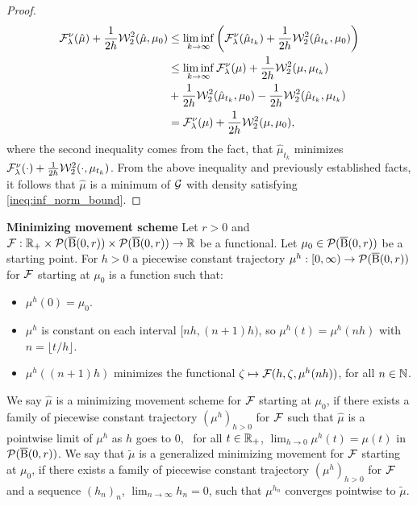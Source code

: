 \begin{proof}
\[
\begin{aligned}
\mathcal{F}^{\nu}_{\lambda}(\hat{\mu}) + \frac{1}{2h} {\cal W}_2^2(\hat{\mu}, \mu_0)  & \leq \liminf_{k \rightarrow \infty} \left( \mathcal{F}^{\nu}_{\lambda}(\hat{\mu}_{t_k}) + \frac{1}{2h} {\cal W}_2^2(\hat{\mu}_{t_k} , \mu_0) \right) \\
& \leq \liminf_{k \rightarrow \infty}  \mathcal{F}^{\nu}_{\lambda}(\mu) + \frac{1}{2h} {\cal W}_2^2(\mu , \mu_{t_k})   \\
& + \frac{1}{2h}  {\cal W}_2^2(\hat{\mu}_{t_k}, \mu_0) - \frac{1}{2h} {\cal W}_2^2(\hat{\mu}_{t_k}, \mu_{t_k})   \\
& = \mathcal{F}^{\nu}_{\lambda} (\mu) + \frac{1}{2h} {\cal W}_2^2(\mu, \mu_0) ,
\end{aligned}
\]
where the second inequality comes from the fact, that $\hat{\mu}_{t_k}$ minimizes $\mathcal{F}^{\nu}_{\lambda}(\cdot) + \frac{1}{2h}{\cal W}_2^2(\cdot, \mu_{t_k})$. From the above inequality and previously established facts, it follows that $\hat{\mu}$ is a minimum of $\mathcal{G}$ with density satisfying \ref{ineq:inf_norm_bound}.
\end{proof}

\begin{definition} \textbf{Minimizing movement scheme}
Let $r >0$ and  $\mathcal{F} : \mathbb{R_+} \times {\cal P}(\operatorname{\overline{B}}(0,r)) \times {\cal P}(\operatorname{\overline{B}}(0,r))\rightarrow \mathbb{R}$ be a functional. Let $\mu_0 \in {\cal P}(\operatorname{\overline{B}}(0,r))$ be a starting point. For $h> 0$ a piecewise constant trajectory $\mu^h : [0, \infty) \rightarrow {\cal P}(\operatorname{\overline{B}}(0,r))$ for $\mathcal{F}$ starting at $\mu_0$ is a function such that:
\begin{itemize}
\item $\mu^h(0) = \mu_0$.
\item $\mu^h$ is constant on each interval $[nh, (n+1)h)$, so $\mu^h(t) = \mu^h(nh)$ with $n = \lfloor t/h \rfloor$.
\item $\mu^h((n+1)h )$ minimizes the  functional $ \zeta  \mapsto \mathcal{F}(h,  \zeta ,\mu^h(nh))$, for all $n \in \mathbb{N}$.
\end{itemize}
We say $\hat{\mu}$ is a minimizing movement scheme for $\mathcal{F}$ starting at $\mu_0$, if there exists a family of piecewise constant trajectory $(\mu^h)_{h >0}$ for $\mathcal{F}$ such that $\hat{\mu}$ is a pointwise limit of $\mu^h$ as $h$ goes to $0$, \ie~for all $t \in \mathbb{R}_+$, $\lim_{h \to 0} \mu^h(t) = \mu(t)$ in ${\cal P}(\operatorname{\overline{B}}(0,r))$. We say that $\tilde{\mu}$ is a generalized minimizing movement for  $\mathcal{F}$ starting at $\mu_0$, if there exists a family of piecewise constant trajectory $(\mu^h)_{h >0}$ for $\mathcal{F}$ and  a sequence $(h_n)_n$, $\lim_{n \to \infty} h_n = 0$, such that $\mu^{h_n}$ converges pointwise to $\tilde{\mu}$.
\end{definition}


